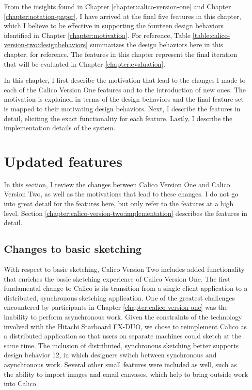 From the insights found in Chapter \ref{chapter:calico-version-one} and Chapter \ref{chapter:notation-paper}, I have arrived at the final five features in this chapter, which I believe to be effective in supporting the fourteen design behaviors identified in Chapter \ref{chapter:motivation}. For reference, Table \ref{table:calico-version-two:designbehaviors} summarizes the design behaviors here in this chapter, for reference. The features in this chapter represent the final iteration that will be evaluated in Chapter \ref{chapter:evaluation}.

In this chapter, I first describe the motivation that lead to the changes I made to each of the Calico Version One features and to the introduction of new ones. The motivation is explained in terms of the design behaviors and the final feature set is mapped to their motivating design behaviors. Next, I describe the features in detail, eliciting the exact functionality for each feature. Lastly, I describe the implementation details of the system.

\section{Updated features}
\label{chapter:calico-version-two:features}

In this section, I review the changes between Calico Version One and Calico Version Two, as well as the motivations that lead to these changes. I do not go into great detail for the features here, but only refer to the features at a high level. Section \ref{chapter:calico-version-two:implementation} describes the features in detail.

\subsection{Changes to basic sketching}

With respect to basic sketching, Calico Version Two includes added functionality that enriches the basic sketching experience of Calico Version One. The first fundamental change to Calico is its transition from a single client application to a distributed, synchronous sketching application. One of the greatest challenges encountered by participants in Chapter \ref{chapter:calico-version-one} was the inability to perform asynchronous work. Given the constraints of the technology involved with the Hitachi Starboard FX-DUO, we chose to reimplement Calico as a distributed application so that users on separate machines could sketch at the same time. The inclusion of distributed, synchronous sketching better supports design behavior 12, in which designers switch between synchronous and asynchronous work. Several other small features were included as well, such as the ability to import images and email canvases, which help to bring outside work into Calico.


